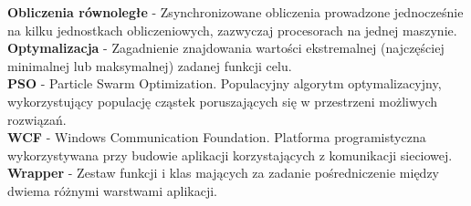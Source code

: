 \documentclass[12pt, twoside, openany, abstract=on]{report}
\theoremstyle{definition}
\begin{document}
\textbf{Obliczenia równoległe} - Zsynchronizowane obliczenia prowadzone jednocześnie na kilku jednostkach obliczeniowych, zazwyczaj procesorach na jednej maszynie.\\
\textbf{Optymalizacja} - Zagadnienie znajdowania wartości ekstremalnej (najczęściej minimalnej lub maksymalnej) zadanej funkcji celu.\\
\textbf{PSO} - Particle Swarm Optimization. Populacyjny algorytm optymalizacyjny, wykorzystujący populację cząstek poruszających się w przestrzeni możliwych rozwiązań.\\
\textbf{WCF} - Windows Communication Foundation. Platforma programistyczna wykorzystywana przy budowie aplikacji korzystających z komunikacji sieciowej.\\
\textbf{Wrapper} - Zestaw funkcji i klas mających za zadanie pośredniczenie między dwiema różnymi warstwami aplikacji.\\


\end{document}
